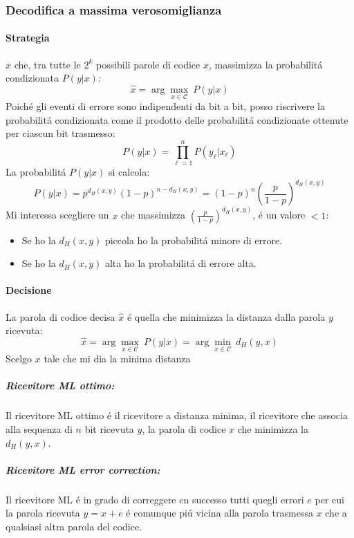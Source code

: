         \subsubsection{Decodifica a massima verosomiglianza}
            \paragraph{Strategia}
                $\hat{x}$ che, tra tutte le $2^k$ possibili parole di codice $x$, massimizza la probabilitá condizionata 
                $P(y|x)$:
                \[
                    \hat{x} = \arg \underset{x\in\mathcal{C}}{\max}\ P(y|x)
                \]
                Poiché gli eventi di errore sono indipendenti da bit a bit, posso riscrivere la probabilitá condizionata come il prodotto delle probabilitá condizionate
                ottenute per ciascun bit trasmesso:
                \[
                    P(y|x) = \prod_{\ell=1}^{n} P(y_\ell|x_\ell)
                \]
                La probabilitá $P(y|x)$ si calcola:
                \[
                    P(y|x) = p^{d_H(x,y)}(1-p)^{n-d_H(x,y)} =(1-p)^{n}\left(\frac{p}{1-p}\right)^{d_H(x,y)} 
                \]
                Mi interessa scegliere un $x$ che massimizza $\left(\frac{p}{1-p}\right)^{d_H(x,y)}$, é un valore $<1$:
                \begin{itemize}
                    \item {
                        Se ho la $d_H(x,y)$ piccola ho la probabilitá minore di errore.
                    }
                    \item {
                        Se ho la $d_H(x,y)$ alta ho la probabilitá di errore alta.
                    }
                \end{itemize}
            \paragraph{Decisione}
                La parola di codice decisa $\hat{x}$ é quella che minimizza la distanza dalla parola $y$ ricevuta:
                \[
                    \hat{x} = \arg \underset{x\in\mathcal{C}}{\max}\ P(y|x) = \arg \underset{x\in\mathcal{C}}{\min}\ d_H(y,x)
                \]
                Scelgo $x$ tale che mi dia la minima distanza
                \subparagraph{Ricevitore ML ottimo:} Il ricevitore ML ottimo é il ricevitore a distanza minima, il ricevitore
                che associa alla sequenza di $n$ bit ricevuta $y$, la parola di codice $x$ che minimizza la $d_H(y,x)$.
                \subparagraph{Ricevitore ML error correction:} Il ricevitore ML é in grado di correggere cn successo tutti quegli errori
                $e$ per cui la parola ricevuta $y = x+e$ é comunque piú vicina alla parola trasmessa $x$ che a qualsiasi altra parola del codice.
                
